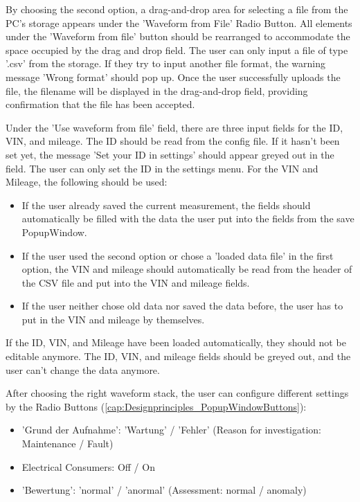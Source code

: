 \documentclass{scrreprt}
\begin{document}
By choosing the second option, a drag-and-drop area for selecting a file from the PC's storage appears under the 'Waveform from File' Radio Button. 
All elements under the 'Waveform from file' button should be rearranged to accommodate the space occupied by the drag and drop field. 
The user can only input a file of type '.csv' from the storage. If they try to input another file format, the warning message 'Wrong format' should pop up. 
Once the user successfully uploads the file, the filename will be displayed in the drag-and-drop field, providing confirmation that the file has been accepted.

Under the 'Use waveform from file' field, there are three input fields for the ID, VIN, and mileage. The ID should be read from the config file. 
If it hasn't been set yet, the message 'Set your ID in settings' should appear greyed out in the field. The user can only set the ID in the settings menu. For the VIN and Mileage, the following should be used:
\begin{itemize}
    \item If the user already saved the current measurement, the fields should automatically be filled with the data the user put into the fields from the save PopupWindow.
    \item If the user used the second option or chose a 'loaded data file' in the first option, the VIN and mileage should automatically be read from the header of the CSV file and put into the VIN and mileage fields.
    \item If the user neither chose old data nor saved the data before, the user has to put in the VIN and mileage by themselves.
\end{itemize}

If the ID, VIN, and Mileage have been loaded automatically, they should not be editable anymore. The ID, VIN, and mileage fields should be greyed out, and the user can't change the data anymore.

After choosing the right waveform stack, the user can configure different settings by the Radio Buttons (\ref{cap:Designprinciples_PopupWindowButtons}):
\begin{itemize}
    \item 'Grund der Aufnahme': 'Wartung' / 'Fehler' (Reason for investigation: Maintenance / Fault)
    \item Electrical Consumers: Off / On
    \item 'Bewertung': 'normal' / 'anormal' (Assessment: normal / anomaly)
\end{itemize}
\end{document}
